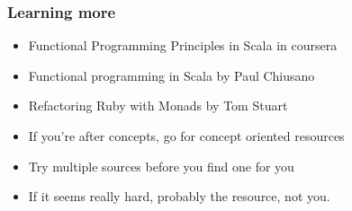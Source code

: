 \documentclass{beamer}
\begin{document}
\begin{frame}
\frametitle{Learning more}
\begin{itemize}
\item Functional Programming Principles in Scala in coursera
\item Functional programming in Scala by Paul Chiusano
\item Refactoring Ruby with Monads by Tom Stuart
\item If you're after concepts, go for concept oriented resources
\item Try multiple sources before you find one for you
\item If it seems really hard, probably the resource, not you.
\end{itemize}
\end{frame}
\end{document}
